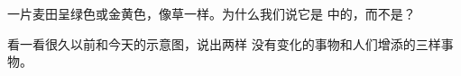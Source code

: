 \begin{exercise}[$\star\star$]\label{exo:g1:landscapes-around-us:10}
一片麦田呈绿色或金黄色，像草一样。为什么我们说它是
中的，而不是？
\end{exercise}

\begin{exercise}[$\star\star$]\label{exo:g1:landscapes-around-us:11}
看一看很久以前和今天的示意图，说出两样
没有变化的事物和人们增添的三样事物。
\end{exercise}
